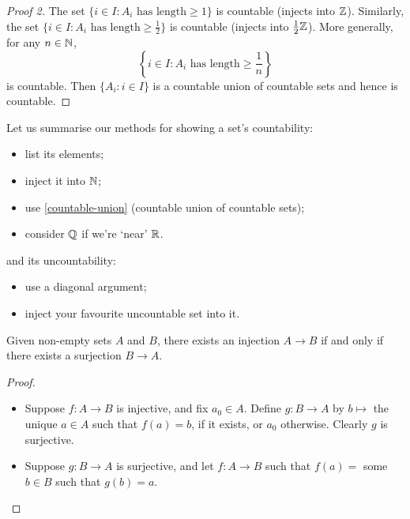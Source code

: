 \documentclass{../template/note}
\begin{document}
    \begin{proof}[Proof 2]
        The set \(\{i \in I: A_i \text{ has length} \geq 1\}\) is countable (injects into \(\mathbb Z\)). Similarly, the set \(\{i \in I: A_i \text{ has length} \geq \frac 1 2\}\) is countable (injects into \(\frac{1}{2}\mathbb Z\)). More generally, for any \(n \in \mathbb N\),
        \[
            \left\{i \in I: A_i \text{ has length} \geq \frac 1 n\right\}
        \]
        is countable. Then \(\{A_i: i \in I\}\) is a countable union of countable sets and hence is countable.
    \end{proof}
    

    Let us summarise our methods for showing a set's countability:
    \begin{itemize}
        \item list its elements;
        \item inject it into \(\mathbb N\);
        \item use \cref{countable-union} (countable union of countable sets);
        \item consider \(\mathbb Q\) if we're `near' \(\mathbb R\).
    \end{itemize}
    and its uncountability:
    \begin{itemize}
        \item use a diagonal argument;
        \item inject your favourite uncountable set into it.
    \end{itemize}
    
    \begin{lemma}
        Given non-empty sets \(A\) and \(B\), there exists an injection \(A \to B\) if and only if there exists a surjection \(B \to A\).
    \end{lemma}
    
    \begin{proof}
        \begin{itemize}
            \item[\(\implies\)] Suppose \(f: A \to B\) is injective, and fix \(a_0 \in A\). Define \(g: B \to A\) by \(b \mapsto\) the unique \(a \in A\) such that \(f(a) = b\), if it exists, or \(a_0\) otherwise. Clearly \(g\) is surjective.
            \item[\(\impliedby\)] Suppose \(g: B \to A\) is surjective, and let \(f: A \to B\) such that \(f(a) =\) some \(b \in B\) such that \(g(b) = a\).
        \end{itemize}
    \end{proof}
    
\end{document}
